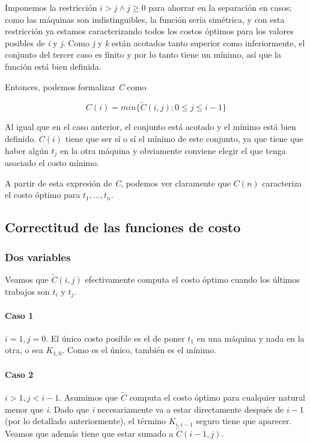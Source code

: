\documentclass[a4paper]{report}
\begin{document}
\medskip

Imponemos la restricción $i>j \land j \geq 0$ para ahorrar en la separación en casos; como las máquinas son indistinguibles, la función sería simétrica, y con esta restricción ya estamos caracterizando todos los costos óptimos para los valores posibles de \textit{i} y \textit{j}. Como \textit{j} y \textit{k} están acotados tanto superior como inferiormente, el conjunto del tercer caso es finito y por lo tanto tiene un mínimo, así que la función está bien definida.

Entonces, podemos formalizar \textit{C} como

$$
C(i) = min\{ \tilde{C}(i, j) : 0 \leq j \leq i-1 \}
$$

\medskip

Al igual que en el caso anterior, el conjunto está acotado y el mínimo está bien definido. $C(i)$ tiene que ser sí o sí el mínimo de este conjunto, ya que tiene que haber algún $t_{j}$ en la otra máquina y obviamente conviene elegir el que tenga asociado el costo mínimo.

A partir de esta expresión de \textit{C}, podemos ver claramente que $C(n)$ caracteriza el costo óptimo para $t_{1},...,t_{n}$.

\subsection{Correctitud de las funciones de costo}

\subsubsection{Dos variables}

Veamos que $\tilde{C}(i,j)$ efectivamente computa el costo óptimo cuando los últimos trabajos son $t_{i}$ y $t_{j}$.

\paragraph{Caso 1} $i = 1, j = 0$. El único costo posible es el de poner $t_{1}$ en una máquina y nada en la otra, o sea $K_{1,0}$. Como es el único, también es el mínimo.

\paragraph{Caso 2} $i > 1, j < i-1$. Asumimos que $\tilde{C}$ computa el costo óptimo para cualquier natural menor que \textit{i}. Dado que \textit{i} necesariamente va a estar directamente después de $i-1$ (por lo detallado anteriormente), el término $K_{i,i-1}$ seguro tiene que aparecer. Veamos que además tiene que estar sumado a $\tilde{C}(i-1,j)$.
\end{document}
